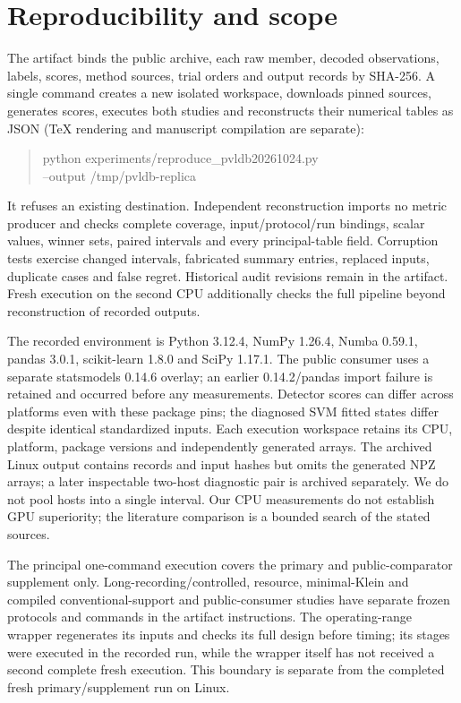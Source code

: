 \section{Reproducibility and scope}
The artifact binds the public archive, each raw member, decoded observations,
labels, scores, method sources, trial orders and output records by SHA-256.
A single command creates a new isolated workspace, downloads pinned sources,
generates scores, executes both studies and reconstructs their numerical tables
as JSON (TeX rendering and manuscript compilation are separate):
\begin{quote}\small\ttfamily
python experiments/reproduce\_pvldb20261024.py\\
\hspace*{1em}--output /tmp/pvldb-replica
\end{quote}
It refuses an existing destination. Independent reconstruction imports no
metric producer and checks complete coverage, input/protocol/run bindings,
scalar values, winner sets, paired intervals and every principal-table field.
Corruption tests exercise changed intervals, fabricated summary entries,
replaced inputs, duplicate cases and false regret. Historical audit revisions
remain in the artifact. Fresh execution on the second CPU additionally checks
the full pipeline beyond reconstruction of recorded outputs.

The recorded environment is Python 3.12.4, NumPy 1.26.4, Numba 0.59.1,
pandas 3.0.1, scikit-learn 1.8.0 and SciPy 1.17.1. The public consumer uses
a separate statsmodels 0.14.6 overlay; an earlier 0.14.2/pandas import failure
is retained and occurred before any measurements. Detector scores can differ
across platforms even with these package pins; the diagnosed SVM fitted states
differ despite identical standardized inputs. Each execution workspace retains its CPU, platform,
package versions and independently generated arrays. The archived Linux output
contains records and input hashes but omits the generated NPZ arrays; a later
inspectable two-host diagnostic pair is archived separately. We do not
pool hosts into a single interval. Our CPU measurements do not establish GPU superiority;
the literature comparison is a bounded search of the stated sources.

The principal one-command execution covers the primary and public-comparator
supplement only. Long-recording/controlled, resource, minimal-Klein and
compiled conventional-support and public-consumer studies
have separate frozen protocols and commands in the artifact instructions.
The operating-range wrapper regenerates its inputs and checks its full design
before timing; its stages were executed in the recorded run, while the wrapper
itself has not received a second complete fresh execution. This boundary is
separate from the completed fresh primary/supplement run on Linux.

